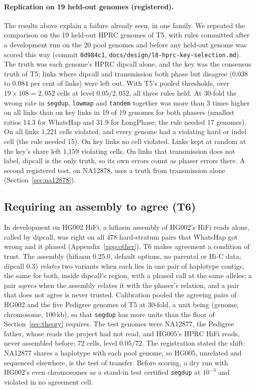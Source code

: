 \documentclass[11pt]{article}
\theoremstyle{definition}
\theoremstyle{remark}
\begin{document}
\paragraph{Replication on 19 held-out genomes (registered).} The results
above explain a failure already seen, in one family. We repeated the
comparison on the 19 held-out HPRC genomes of T5, with rules committed
after a development run on the 20 pool genomes and before any held-out
genome was scored this way (commit \texttt{0d984c1},
\nolinkurl{docs/design/l8-hprc-key-selection.md}). The truth was each
genome's HPRC dipcall alone, and the key was the consensus truth of T5;
links where dipcall and transmission both phase but disagree (0.038 to
0.084 per cent of links) were left out. With T5's pooled thresholds, over
$19\times108=2{,}052$ cells at level $0.05/2{,}052$, all three rules held.
At 30-fold the wrong rate in \texttt{segdup}, \texttt{lowmap} and
\texttt{tandem} together was more than 3 times higher on all links than on
key links in 19 of 19 genomes for both phasers (smallest ratios 14.3 for
WhatsHap and 31.9 for LongPhase; the rule needed 17 genomes). On all links
1{,}221 cells violated, and every genome had a violating hard or indel cell
(the rule needed 15). On key links no cell violated. Links kept at random
at the key's share left 1{,}159 violating cells. On links that transmission
does not label, dipcall is the only truth, so its own errors count as
phaser errors there. A second registered test, on NA12878, uses a truth
from transmission alone (Section~\ref{sec:na12878}).

\subsection{Requiring an assembly to agree (T6)}\label{sec:t6}

In development on HG002 HiFi, a hifiasm assembly of HG002's HiFi reads alone,
called by dipcall, was right on all 478 hard-stratum pairs that WhatsHap got
wrong and it phased (Appendix~\ref{app:other}). T6 makes agreement a
condition of trust. The assembly (hifiasm 0.25.0, default options, no
parental or Hi-C data; dipcall 0.3) \emph{relates} two variants when each
lies in one pair of haplotype contigs, the same for both, inside dipcall's
region, with a phased call at the same alleles; a pair \emph{agrees} when
the assembly relates it with the phaser's relation, and a pair that does not
agree is never trusted. Calibration pooled the agreeing pairs of HG002 and
the five Pedigree genomes of T5 at 30-fold, a unit being (genome,
chromosome, 100\,kb), so that \texttt{segdup} has more units than the floor
of Section~\ref{sec:theory} requires. The test genomes were NA12877, the
Pedigree father, whose reads the project had not read, and HG005's HPRC HiFi
reads, never assembled before; 72 cells, level $0.05/72$. The registration
stated the shift: NA12877 shares a haplotype with each pool genome, so HG005,
unrelated and sequenced elsewhere, is the test of transfer. Before scoring,
a dry run with HG002's even chromosomes as a stand-in test certified
\texttt{segdup} at $10^{-3}$ and violated in no agreement cell.
\end{document}
